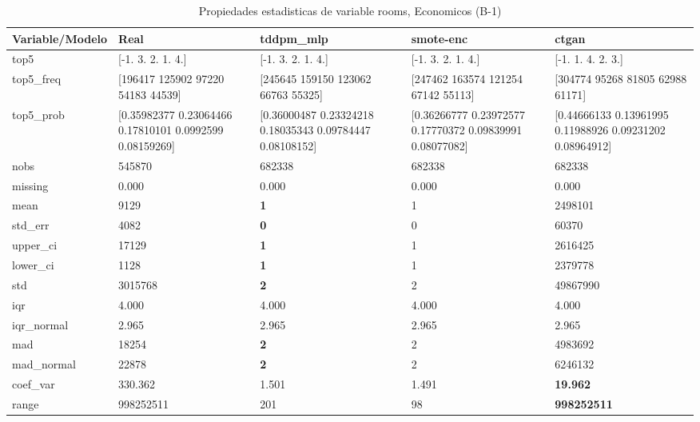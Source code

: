 \begin{table}[H]
\centering
\fontsize{8}{14}\selectfont
\caption{Propiedades  estadisticas de variable rooms, Economicos (B-1)}
\label{table-stats-economicos-b-1-rooms}
\begin{tabular}{|l|m{10em}|m{10em}|m{10em}|m{10em}|}
\hline
 \rowcolor[gray]{0.8}
Variable/Modelo & Real & tddpm\_mlp & smote-enc & ctgan \\
\hline top5 & [-1.  3.  2.  1.  4.] & [-1.  3.  2.  1.  4.] & [-1.  3.  2.  1.  4.] & [-1.  1.  4.  2.  3.] \\
\hline top5\_freq & [196417 125902  97220  54183  44539] & [245645 159150 123062  66763  55325] & [247462 163574 121254  67142  55113] & [304774  95268  81805  62988  61171] \\
\hline top5\_prob & [0.35982377 0.23064466 0.17810101 0.0992599  0.08159269] & [0.36000487 0.23324218 0.18035343 0.09784447 0.08108152] & [0.36266777 0.23972577 0.17770372 0.09839991 0.08077082] & [0.44666133 0.13961995 0.11988926 0.09231202 0.08964912] \\
\hline nobs & 545870 & 682338 & 682338 & 682338 \\
\hline missing & 0.000 & 0.000 & 0.000 & 0.000 \\
\hline mean & 9129 & \bfseries 1 & 1 & \cellcolor[rgb]{0.9, 0.54, 0.52} 2498101 \\
\hline std\_err & 4082 & \bfseries 0 & 0 & \cellcolor[rgb]{0.9, 0.54, 0.52} 60370 \\
\hline upper\_ci & 17129 & \bfseries 1 & 1 & \cellcolor[rgb]{0.9, 0.54, 0.52} 2616425 \\
\hline lower\_ci & 1128 & \bfseries 1 & 1 & \cellcolor[rgb]{0.9, 0.54, 0.52} 2379778 \\
\hline std & 3015768 & \bfseries 2 & 2 & \cellcolor[rgb]{0.9, 0.54, 0.52} 49867990 \\
\hline iqr & 4.000 & 4.000 & 4.000 & 4.000 \\
\hline iqr\_normal & 2.965 & 2.965 & 2.965 & 2.965 \\
\hline mad & 18254 & \bfseries 2 & 2 & \cellcolor[rgb]{0.9, 0.54, 0.52} 4983692 \\
\hline mad\_normal & 22878 & \bfseries 2 & 2 & \cellcolor[rgb]{0.9, 0.54, 0.52} 6246132 \\
\hline coef\_var & 330.362 & 1.501 & \cellcolor[rgb]{0.9, 0.54, 0.52} 1.491 & \bfseries 19.962 \\
\hline range & 998252511 & 201 & \cellcolor[rgb]{0.9, 0.54, 0.52} 98 & \bfseries 998252511 \\

\end{tabular}
\end{table}
